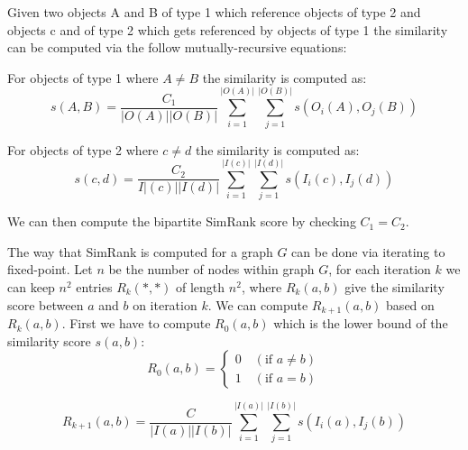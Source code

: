 \begin{definition}\label{def:bipartite_simrank} Given two objects A and B of type 1 which reference objects of type 2 and objects c and of type 2 which gets referenced by objects of type 1 the similarity can be computed via the follow mutually-recursive equations:
	
	For objects of type 1 where $A \neq B$ the similarity is computed as:
	\begin{equation}
	s(A,B)= \frac{C_1}{|O(A)||O(B)|}\sum^{|O(A)|}_{i=1}\sum^{|O(B)|}_{j=1}s(O_i(A),O_j(B))
	\end{equation}
	
	For objects of type 2 where $c \neq d$ the similarity is computed as:
	\begin{equation}
	s(c,d)= \frac{C_2}{I|(c)||I(d)|}\sum^{|I(c)|}_{i=1}\sum^{|I(d)|}_{j=1}s(I_i(c),I_j(d))
	\end{equation}
	
	We can then compute the bipartite SimRank score by checking $C_1 = C_2$\cite{10.1145/775047.775126}.
\end{definition}

The way that SimRank is computed for a graph $G$ can be done via iterating to fixed-point. Let $n$ be the number of nodes within graph $G$, for each iteration $k$ we can keep $n^2$ entries $R_k(*,*)$ of length $n^2$, where $R_k(a,b)$ give the similarity score between $a$ and $b$ on iteration $k$\cite{10.1145/775047.775126}. We can compute $R_{k+1}(a,b)$ based on $R_k(a,b)$. First we have to compute $R_0(a,b)$ which is the lower bound of the similarity score $s(a,b)$:
\begin{equation}
R_0(a,b)= \begin{cases}
0 \quad (\text{if } a \neq b) \\
1 \quad (\text{if } a = b)
\end{cases}
\end{equation}

\begin{equation}
R_{k+1}(a,b)= \frac{C}{|I(a)||I(b)|}\sum^{|I(a)|}_{i=1}\sum^{|I(b)|}_{j=1}s(I_i(a),I_j(b))
\end{equation}

